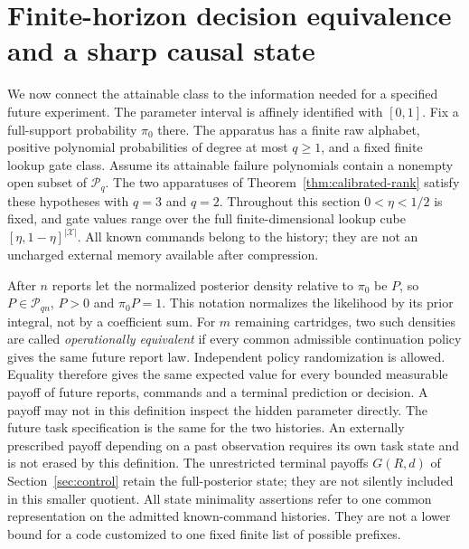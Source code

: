 \section{Finite-horizon decision equivalence and a sharp causal state}\label{sec:decision-horizon}
We now connect the attainable class to the information needed for a
specified future experiment. The parameter interval is affinely identified
with $[0,1]$. Fix a full-support probability $\pi_0$ there. The apparatus
has a finite raw alphabet, positive polynomial probabilities of degree at
most $q\ge1$, and a fixed finite lookup gate class. Assume its attainable
failure polynomials contain a nonempty open subset of $\mathcal P_q$.
The two apparatuses of Theorem~\ref{thm:calibrated-rank} satisfy these
hypotheses with $q=3$ and $q=2$. Throughout this section $0<\eta<1/2$ is fixed, and gate values range over
the full finite-dimensional lookup cube $[\eta,1-\eta]^{|\mathcal X|}$.
All known commands belong to the history;
they are not an uncharged external memory available after compression.

After $n$ reports let the normalized posterior density relative to $\pi_0$
be $P$, so $P\in\mathcal P_{qn}$, $P>0$ and $\pi_0P=1$. This notation
normalizes the likelihood by its prior integral, not by a coefficient sum.
For $m$ remaining cartridges, two such densities are called
\emph{operationally equivalent} if every common admissible continuation
policy gives the same future report law. Independent policy randomization
is allowed. Equality therefore gives the same expected value for every
bounded measurable payoff of future reports, commands and a terminal
prediction or decision. A payoff may not in this definition inspect the
hidden parameter directly. The future task specification is the same for
the two histories. An externally prescribed payoff depending on a past
observation requires its own task state and is not erased by this definition. The unrestricted terminal payoffs $G(R,d)$ of
Section~\ref{sec:control} retain the full-posterior state; they are not
silently included in this smaller quotient. All state minimality assertions
refer to one common representation on the admitted known-command histories.
They are not a lower bound for a code customized to one fixed finite list
of possible prefixes.

